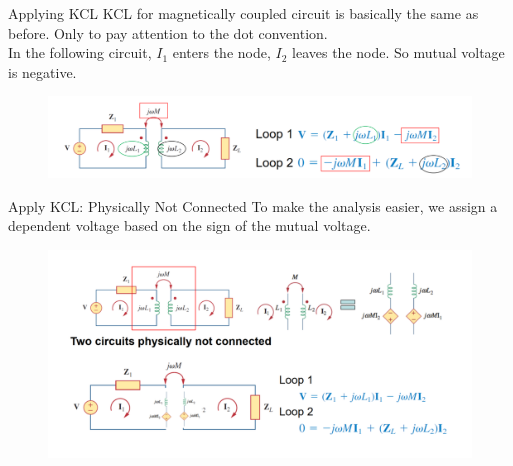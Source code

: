 \documentclass{beamer}
\begin{document}
\begin{frame}{Applying KCL}
KCL for magnetically coupled circuit is basically the same as before. Only to pay attention to the dot convention.\\
In the following circuit, $I_1$ enters the node, $I_2$ leaves the node. So mutual voltage is negative.
\begin{figure}[H]
        \centering
        \includegraphics[width=1\textwidth]{C13/3.png}
    \end{figure}
\end{frame} 

\begin{frame}{Apply KCL: Physically Not Connected}
To make the analysis easier, we assign a dependent voltage based on the sign of the mutual voltage.
\begin{figure}[H]
        \centering
        \includegraphics[width=1\textwidth]{C13/4.png}
    \end{figure}
\end{frame}

\end{document}
